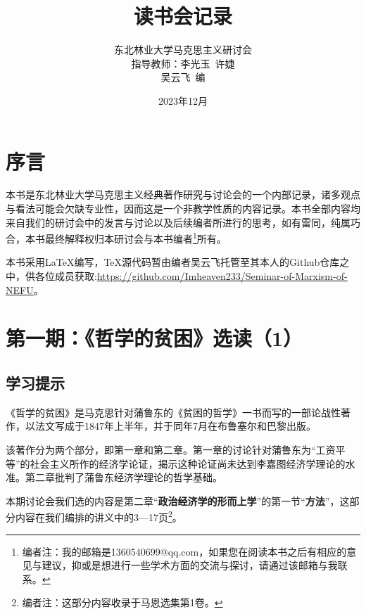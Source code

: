 \documentclass[a4paper,twoside,12pt,AutoFakeBold]{ctexart}
\title{读书会记录}
\author{东北林业大学马克思主义研讨会\\
指导教师：李光玉~许婕\\
 吴云飞~编}
\date{2023年12月}
\begin{document}
\maketitle
\newpage



\tableofcontents%

\newpage

\section{序言}

\begin{adjustwidth}{2em}{2em}
\qquad\fangsong 
本书是东北林业大学马克思主义经典著作研究与讨论会的一个内部记录，诸多观点与看法可能会欠缺专业性，因而这是一个非教学性质的内容记录。本书全部内容均来自我们的研讨会中的发言与讨论以及后续编者所进行的思考，如有雷同，纯属巧合，本书最终解释权归本研讨会与本书编者\footnote{编者注：我的邮箱是1360540699@qq.com，如果您在阅读本书之后有相应的意见与建议，抑或是想进行一些学术方面的交流与探讨，请通过该邮箱与我联系。}所有。

本书采用\LaTeX{}编写，\TeX{}源代码暂由编者吴云飞托管至其本人的Github仓库之中，供各位成员获取:\url{https://github.com/Imheaven233/Seminar-of-Marxism-of-NEFU}。



\end{adjustwidth}




\newpage

\section{第一期：《哲学的贫困》选读（1）}

\subsection{学习提示}\label{sec:1}

《哲学的贫困》是马克思针对蒲鲁东的《贫困的哲学》一书而写的一部论战性著作，以法文写成于1847年上半年，并于同年7月在布鲁塞尔和巴黎出版。

该著作分为两个部分，即第一章和第二章。第一章的讨论针对蒲鲁东为“工资平等”的社会主义所作的经济学论证，揭示这种论证尚未达到李嘉图经济学理论的水准。第二章批判了蒲鲁东经济学理论的哲学基础。

本期讨论会我们选的内容是第二章“\textbf{政治经济学的形而上学}”的第一节“\textbf{方法}”，这部分内容在我们编排的讲义中的3—17页\footnote{编者注：这部分内容收录于马恩选集第1卷。}。
\end{document}

